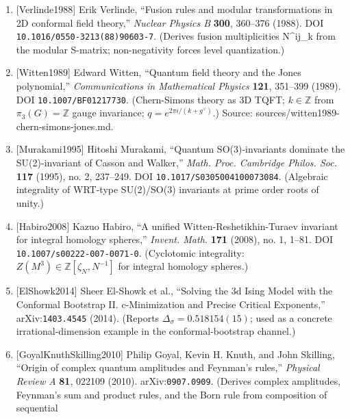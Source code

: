 \documentclass[
]{article}
\begin{document}
\begin{enumerate}
  ``Invariants of 3-manifolds via link polynomials and quantum groups,''
  \emph{Inventiones Mathematicae} \textbf{103}, 547--598 (1991). DOI
  \texttt{10.1007/BF01239527}. (RT construction: ribbon categories +
  quantum groups → 3-manifold invariants; forces
  \(q_{\rm QG}=e^{2\pi i/(k+g^\vee)}\) from unitarity of the modular
  tensor category.)
\item
  {[}Verlinde1988{]} Erik Verlinde, ``Fusion rules and modular
  transformations in 2D conformal field theory,'' \emph{Nuclear Physics
  B} \textbf{300}, 360--376 (1988). DOI
  \texttt{10.1016/0550-3213(88)90603-7}. (Derives fusion multiplicities
  N\^{}ij\_k from the modular S-matrix; non-negativity forces level
  quantization.)
\item
  {[}Witten1989{]} Edward Witten, ``Quantum field theory and the Jones
  polynomial,'' \emph{Communications in Mathematical Physics}
  \textbf{121}, 351--399 (1989). DOI \texttt{10.1007/BF01217730}.
  (Chern-Simons theory as 3D TQFT; \(k\in\mathbb Z\) from
  \(\pi_3(G)=\mathbb Z\) gauge invariance; \(q=e^{2\pi i/(k+g^\vee)}\).)
  Source: sources/witten1989-chern-simons-jones.md.
\item
  {[}Murakami1995{]} Hitoshi Murakami, ``Quantum SO(3)-invariants
  dominate the SU(2)-invariant of Casson and Walker,'' \emph{Math. Proc.
  Cambridge Philos. Soc.} \textbf{117} (1995), no. 2, 237--249. DOI
  \texttt{10.1017/S0305004100073084}. (Algebraic integrality of WRT-type
  SU(2)/SO(3) invariants at prime order roots of unity.)
\item
  {[}Habiro2008{]} Kazuo Habiro, ``A unified Witten-Reshetikhin-Turaev
  invariant for integral homology spheres,'' \emph{Invent. Math.}
  \textbf{171} (2008), no. 1, 1--81. DOI
  \texttt{10.1007/s00222-007-0071-0}. (Cyclotomic integrality:
  \(Z(M^3)\in\mathbb Z[\zeta_N,N^{-1}]\) for integral homology spheres.)
\item
  {[}ElShowk2014{]} Sheer El-Showk et al., ``Solving the 3d Ising Model
  with the Conformal Bootstrap II. c-Minimization and Precise Critical
  Exponents,'' arXiv:\texttt{1403.4545} (2014). (Reports
  \(\Delta_\sigma = 0.518154(15)\); used as a concrete
  irrational-dimension example in the conformal-bootstrap channel.)
\item
  {[}GoyalKnuthSkilling2010{]} Philip Goyal, Kevin H. Knuth, and John
  Skilling, ``Origin of complex quantum amplitudes and Feynman's
  rules,'' \emph{Physical Review A} \textbf{81}, 022109 (2010).
  arXiv:\texttt{0907.0909}. (Derives complex amplitudes, Feynman's sum
  and product rules, and the Born rule from composition of sequential

\end{enumerate}
\end{document}
